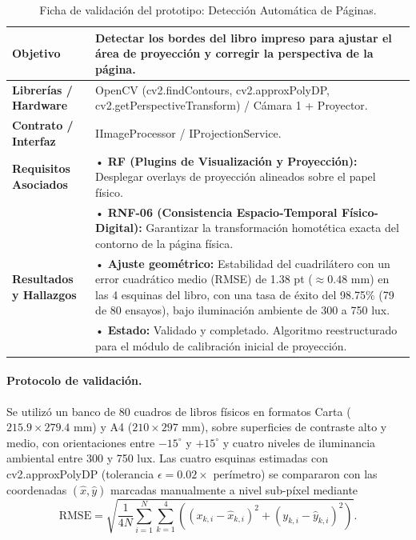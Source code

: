 \begin{table}[H]
    \centering
    \caption{Ficha de validación del prototipo: Detección Automática de Páginas.}
    \label{tab:ficha_f4}
    \begin{tabular}{|L{3.2cm}|L{11.0cm}|}
        \hline
        \textbf{Objetivo} & Detectar los bordes del libro impreso para ajustar el área de proyección y corregir la perspectiva de la página. \\ \hline
        \textbf{Librerías / Hardware} & OpenCV (cv2.findContours, cv2.approxPolyDP, cv2.getPerspectiveTransform) / Cámara 1 + Proyector. \\ \hline
        \textbf{Contrato / Interfaz} & IImageProcessor / IProjectionService. \\ \hline
        \textbf{Requisitos Asociados} &
        • \textbf{RF (Plugins de Visualización y Proyección):} Desplegar overlays de proyección alineados sobre el papel físico. \vspace{0.1cm} \\
        & • \textbf{RNF-06 (Consistencia Espacio-Temporal Físico-Digital):} Garantizar la transformación homotética exacta del contorno de la página física. \\ \hline
        \textbf{Resultados y Hallazgos} &
        • \textbf{Ajuste geométrico:} Estabilidad del cuadrilátero con un error cuadrático medio (RMSE) de 1.38 pt ($\approx 0.48$ mm) en las 4 esquinas del libro, con una tasa de éxito del 98.75\% (79 de 80 ensayos), bajo iluminación ambiente de 300 a 750 lux. \vspace{0.1cm} \\
        & • \textbf{Estado:} Validado y completado. Algoritmo reestructurado para el módulo de calibración inicial de proyección. \\ \hline
    \end{tabular}
\end{table}
 
\paragraph{Protocolo de validación.} Se utilizó un banco de 80 cuadros de libros físicos en formatos Carta ($215.9 \times 279.4$ mm) y A4 ($210 \times 297$ mm), sobre superficies de contraste alto y medio, con orientaciones entre $-15^\circ$ y $+15^\circ$ y cuatro niveles de iluminancia ambiental entre 300 y 750 lux. Las cuatro esquinas estimadas con cv2.approxPolyDP (tolerancia $\epsilon = 0.02 \times$ perímetro) se compararon con las coordenadas $(\hat{x}, \hat{y})$ marcadas manualmente a nivel sub-píxel mediante
\[ \mathrm{RMSE} = \sqrt{\frac{1}{4N} \sum_{i=1}^{N} \sum_{k=1}^{4} \left( (x_{k,i} - \hat{x}_{k,i})^2 + (y_{k,i} - \hat{y}_{k,i})^2 \right)}. \]
 
